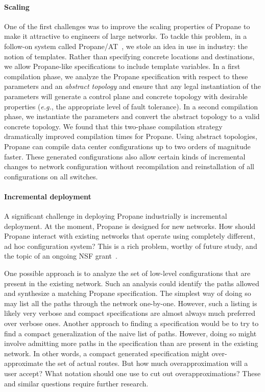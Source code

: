 \documentclass[10pt]{sigalternate052015}
\begin{document}
\paragraph*{Scaling} One of the first challenges was to improve the scaling
properties of Propane to make it attractive to engineers of large
networks.  To tackle this problem, in a follow-on system called Propane/AT~\cite{abstract-propane}, we stole an idea in use in
industry: the notion of templates.  Rather than specifying concrete
locations and destinations, we allow Propane-like specifications to include
template variables.  In a first compilation phase, we analyze the
Propane specification with respect to these parameters and an
\emph{abstract topology} and ensure that any legal instantiation of
the parameters will generate a control plane and concrete topology
with desirable properties (\emph{e.g.}, the appropriate level of fault
tolerance).  In a second compilation phase, we instantiate the
parameters and convert the abstract topology to a valid concrete
topology.  We found that this two-phase compilation strategy
dramatically improved compilation times for Propane.  Using abstract
topologies, Propane can compile data center configurations up to two
orders of magnitude faster.  These generated configurations also
allow certain kinds of incremental changes to network configuration
without recompilation and reinstallation of all configurations on all
switches.  

\paragraph*{Incremental deployment}  A significant challenge in
deploying Propane industrially is incremental deployment. 
At the moment, Propane is designed for new
networks. How should Propane interact
with existing networks that operate using completely different, ad
hoc configuration system?  This is a rich problem, worthy of future
study, and the topic of an ongoing NSF grant~\cite{nsf-propane}.

One possible approach is to analyze the set of
low-level configurations that are present in the existing
network.  Such an analysis could identify the paths allowed and
synthesize a matching Propane specification.  The simplest way of
doing so may list all the paths through the network one-by-one.
However, such a listing is likely very verbose and compact specifications
are almost always much preferred over verbose ones.  Another approach to
finding a specification would be to try to find a compact
generalization of the naive list of paths.  However, doing so might involve
admitting more paths in the specification than are present in the
existing network.  In other words, a compact generated specification
might over-approximate the set of actual routes.  But how much
overapproximation will a user accept?  What notation should one use
to cut out overapproximations?  These and similar questions
require further research.  
\end{document}
